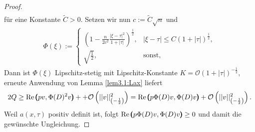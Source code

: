 \begin{proof}
\begin{align}
\end{align}
für eine Konstante $\tilde{C}>0$. Setzen wir nun $c:=\tilde{C}\sqrt{n}$ und 
\begin{align}
	\Phi(\xi):=\begin{cases}
		\left(1-\frac{n}{2c^2}\frac{| \xi-\tau|^2}{1+|\tau|}\right)^{\frac{1}{2}}, &| \xi-\tau| \le C(1+|\tau|)^{\frac{1}{2}},\\
		\sqrt{\frac{1}{2}}, & \text{sonst},
	\end{cases}
\end{align}
Dann ist $\Phi(\xi)$ Lipschitz-stetig mit Lipschitz-Konstante $K=\mathcal O(1+| \tau|)^{-\frac{1}{2}}$, erneute Anwendung von Lemma \ref{lem3.1:Lax} liefert
\begin{align}
	2Q \ge \operatorname{Re}\pmb(pv,\Phi(D)^2v\pmb)++\mathcal{O}\left(|| v||_{\left(-\frac{1}{2}\right)}^2\right) = \operatorname{Re}\pmb(p\Phi(D)v,\Phi(D)v\pmb)+\mathcal{O}\left(|| v||_{\left(-\frac{1}{2}\right)}^2\right).
\end{align}
Weil $a(x,\tau)$ positiv definit ist, folgt $\operatorname{Re}\pmb(p\Phi(D)v,\Phi(D)v\pmb)\ge 0$ und damit die gewünschte Ungleichung. 
\end{proof}

